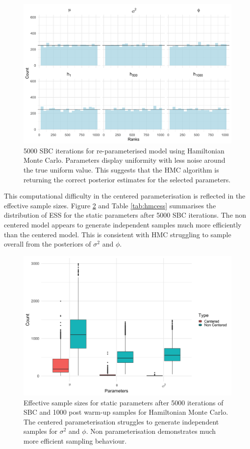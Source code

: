 \documentclass[12pt, a4paper]{article}
\begin{document}
    \begin{figure}[H]
        \centering
        \includegraphics[scale=0.09]{results/hmc_ncp_5k.png}
        \caption{5000 SBC iterations for re-parameterised model using Hamiltonian Monte Carlo. Parameters display uniformity with less noise around the true uniform value. This suggests that the HMC algorithm is returning the correct posterior estimates for the selected parameters.}
        \label{fig:ncphmc5k}
    \end{figure}

    This computational difficulty in the centered parameterisation is reflected in the effective sample sizes. Figure \ref{fig:hmcess} and Table \ref{tab:hmcess} summarises the distribution of ESS for the static parameters after 5000 SBC iterations. The non centered model appears to generate independent samples much more efficiently than the centered model. This is consistent with HMC struggling to sample overall from the posteriors of $\sigma^2$ and $\phi$.

    \begin{figure}[H]
        \centering
        \includegraphics[scale=0.09]{results/hmc_ess.png}
        \caption{Effective sample sizes for static parameters after 5000 iterations of SBC and 1000 post warm-up samples for Hamiltonian Monte Carlo. The centered parameterisation struggles to generate independent samples for $\sigma^2$ and $\phi$. Non parameterisation demonstrates much more efficient sampling behaviour.}
        \label{fig:hmcess}
    \end{figure}
\end{document}
